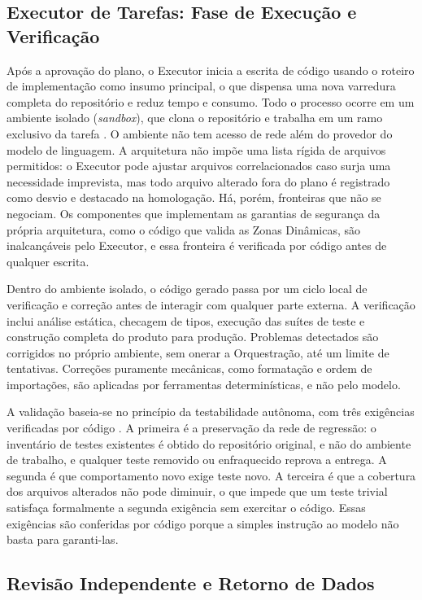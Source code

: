 \subsection{Executor de Tarefas: Fase de Execução e Verificação}\label{sec:4.5.2}

Após a aprovação do plano, o Executor inicia a escrita de código usando o roteiro de implementação como insumo principal, o que dispensa uma nova varredura completa do repositório e reduz tempo e consumo. Todo o processo ocorre em um ambiente isolado (\textit{sandbox}), que clona o repositório e trabalha em um ramo exclusivo da tarefa \cite{chhabra2026security}. O ambiente não tem acesso de rede além do provedor do modelo de linguagem. A arquitetura não impõe uma lista rígida de arquivos permitidos: o Executor pode ajustar arquivos correlacionados caso surja uma necessidade imprevista, mas todo arquivo alterado fora do plano é registrado como desvio e destacado na homologação. Há, porém, fronteiras que não se negociam. Os componentes que implementam as garantias de segurança da própria arquitetura, como o código que valida as Zonas Dinâmicas, são inalcançáveis pelo Executor, e essa fronteira é verificada por código antes de qualquer escrita.

Dentro do ambiente isolado, o código gerado passa por um ciclo local de verificação e correção antes de interagir com qualquer parte externa. A verificação inclui análise estática, checagem de tipos, execução das suítes de teste e construção completa do produto para produção. Problemas detectados são corrigidos no próprio ambiente, sem onerar a Orquestração, até um limite de tentativas. Correções puramente mecânicas, como formatação e ordem de importações, são aplicadas por ferramentas determinísticas, e não pelo modelo.

A validação baseia-se no princípio da testabilidade autônoma, com três exigências verificadas por código \cite{burte2025sdlc}. A primeira é a preservação da rede de regressão: o inventário de testes existentes é obtido do repositório original, e não do ambiente de trabalho, e qualquer teste removido ou enfraquecido reprova a entrega. A segunda é que comportamento novo exige teste novo. A terceira é que a cobertura dos arquivos alterados não pode diminuir, o que impede que um teste trivial satisfaça formalmente a segunda exigência sem exercitar o código. Essas exigências são conferidas por código porque a simples instrução ao modelo não basta para garanti-las.

\subsection{Revisão Independente e Retorno de Dados}\label{sec:4.5.3}

